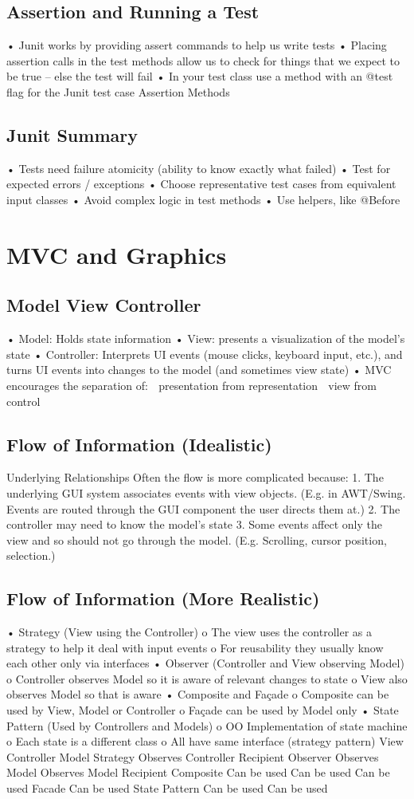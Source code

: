 \documentclass[11pt]{article}
\begin{document}
{{\subsection{Assertion and Running a Test}
• Junit works by providing assert commands to help us write tests
• Placing assertion calls in the test methods allow us to check for things that we expect to be true –
else the test will fail
• In your test class use a method with an @test flag for the Junit test case
Assertion Methods
\subsection{Junit Summary}
• Tests need failure atomicity (ability to know exactly what failed)
• Test for expected errors / exceptions
• Choose representative test cases from equivalent input classes
• Avoid complex logic in test methods
• Use helpers, like @Before
\section{MVC and Graphics}
\subsection{Model View Controller}
• Model: Holds state information
• View: presents a visualization of the model’s state
• Controller: Interprets UI events (mouse clicks, keyboard input, etc.), and turns UI events into
changes to the model (and sometimes view state)
• MVC encourages the separation of:
 presentation from representation
 view from control
\subsection{Flow of Information (Idealistic)}
Underlying Relationships
Often the flow is more complicated because:
1. The underlying GUI system associates events with view objects. (E.g. in AWT/Swing. Events are
routed through the GUI component the user directs them at.)
2. The controller may need to know the model’s state
3. Some events affect only the view and so should not go through the model. (E.g. Scrolling, cursor
position, selection.)
\subsection{Flow of Information (More Realistic)}
• Strategy (View using the Controller)
o The view uses the controller as a strategy to help it deal with input events
o For reusability they usually know each other only via interfaces
• Observer (Controller and View observing Model)
o Controller observes Model so it is aware of relevant changes to state
o View also observes Model so that is aware
• Composite and Façade
o Composite can be used by View, Model or Controller
o Façade can be used by Model only
• State Pattern (Used by Controllers and Models)
o OO Implementation of state machine
o Each state is a different class
o All have same interface (strategy pattern)
View Controller Model
Strategy Observes Controller Recipient
Observer Observes Model Observes Model Recipient
Composite Can be used Can be used Can be used
Facade Can be used
State Pattern Can be used Can be used
}}
\end{document}
